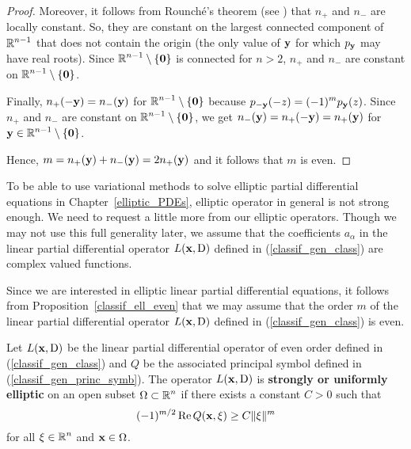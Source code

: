 \begin{proof}
Moreover, it follows from Rounch\'e's theorem (see \cite{Co}) that
$n_+$ and $n_-$ are locally constant.  So, they are constant on the
largest connected component of $\displaystyle \mathbb{R}^{n-1}$ that does not
contain the origin (the only value of $\mathbf{y}$ for which
$p_{\mathbf{y}}$ may have real roots).  Since
$\displaystyle \mathbb{R}^{n-1}\setminus\{\mathbf{0}\}$ is connected for
$n>2$,  $n_+$ and $n_-$ are constant on
$\displaystyle \mathbb{R}^{n-1}\setminus\{\mathbf{0}\}$.

Finally, $n_+(-\mathbf{y}) = n_-(\mathbf{y})$ for
$\displaystyle \mathbb{R}^{n-1}\setminus\{\mathbf{0}\}$ because
$\displaystyle p_{-\mathbf{y}}(-z) = (-1)^m p_{\mathbf{y}}(z)$.  Since $n_+$
and $n_-$ are constant on $\displaystyle \mathbb{R}^{n-1}\setminus\{\mathbf{0}\}$, we get
$n_-(\mathbf{y}) = n_+(-\mathbf{y}) = n_+(\mathbf{y})$ for
$\displaystyle \mathbf{y} \in \mathbb{R}^{n-1}\setminus\{\mathbf{0}\}$.

Hence, $m = n_+(\mathbf{y})+n_-(\mathbf{y}) = 2n_+(\mathbf{y})$ and it follows
that $m$ is even.
\end{proof}

To be able to use variational methods to solve elliptic partial
differential equations in Chapter~\ref{elliptic_PDEs}, elliptic
operator in general is not strong enough.  We need to request a little
more from our elliptic operators.
Though we may not use this full generality later, we assume that the
coefficients $a_\alpha$ in the linear partial differential operator
$L(\mathbf{x}, \operatorname{D})$ defined in (\ref{classif_gen_class}) are complex
valued functions.

Since we are interested in elliptic linear partial differential
equations, it follows from Proposition~\ref{classif_ell_even} that we
may assume that the order $m$ of the linear partial differential operator
$L(\mathbf{x}, \operatorname{D})$ defined in (\ref{classif_gen_class}) is even.

\begin{defn} \label{strong_ell_form}
Let $L(\mathbf{x}, \operatorname{D})$ be the linear partial differential operator of
even order defined in (\ref{classif_gen_class}) and $Q$ be the
associated principal symbol defined in (\ref{classif_gen_princ_symb}).
The operator $L(\mathbf{x}, \operatorname{D})$ is
{\bfseries strongly or uniformly elliptic}%
%
on an open subset $\displaystyle \Omega \subset \mathbb{R}^n$ if there exists
a constant $C>0$ such that
\begin{equation} \label{strong_ell_formEq1}
(-1)^{m/2} \operatorname{Re} Q(\mathbf{x}, \mathbf{\xi}) \geq C \|\mathbf{\xi}\|^m
\end{equation}
for all $\displaystyle \mathbf{\xi} \in \mathbb{R}^n$ and $\mathbf{x}\in \Omega$.
\end{defn}

